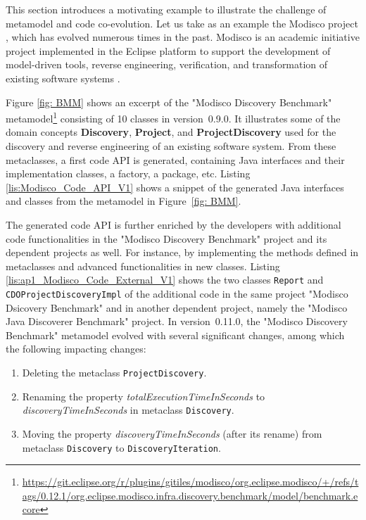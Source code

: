 This section introduces a motivating example to illustrate the challenge of metamodel and code co-evolution. 
Let us take as an example the Modisco project \cite{MDTModisco}, which has evolved numerous times in the past. Modisco is an academic initiative project implemented in the Eclipse platform to support the development of model-driven tools, reverse engineering, verification, and transformation of existing software systems \cite{bruneliere2010modisco,bruneliere2014modisco}.


Figure \ref{fig: BMM} shows an excerpt of the "Modisco Discovery Benchmark" metamodel\footnote{\url{https://git.eclipse.org/r/plugins/gitiles/modisco/org.eclipse.modisco/+/refs/tags/0.12.1/org.eclipse.modisco.infra.discovery.benchmark/model/benchmark.ecore}} consisting of 10 classes in version~0.9.0.
It illustrates some of the domain concepts \textbf{Discovery}, \textbf{Project}, and \textbf{ProjectDiscovery}  used for the discovery and reverse engineering of an existing software system. 
From these metaclasses, a first code API is generated, containing Java interfaces and their implementation classes, a factory, a package, etc. Listing \ref{lis:Modisco_Code_API_V1} shows a snippet of the generated Java interfaces and classes from the metamodel in Figure~\ref{fig: BMM}. 

The generated code API is further enriched by the developers with additional code functionalities in the "Modisco Discovery Benchmark" project and its dependent projects as well.
For instance, by implementing the methods defined in metaclasses and advanced functionalities in new classes. Listing \ref{lis:ap1_Modisco_Code_External_V1} shows the two classes \texttt{Report} and \texttt{CDOProjectDiscoveryImpl} of the additional code in the same project "Modisco Dsicovery Benchmark" and in another dependent project, namely the "Modisco Java Discoverer Benchmark" project. 
In version~0.11.0, the "Modisco Discovery Benchmark" metamodel evolved with several significant changes, among which the following impacting changes:

\begin{enumerate}%
	
	\item Deleting the metaclass \texttt{ProjectDiscovery}. 
	
	\item Renaming the property \emph{totalExecutionTimeInSeconds} to \emph{discoveryTimeInSeconds} in metaclass \texttt{Discovery}. 
	
	\item Moving the property \emph{discoveryTimeInSeconds} (after its rename) from metaclass \texttt{Discovery} to \texttt{DiscoveryIteration}. 
	
\end{enumerate} 


